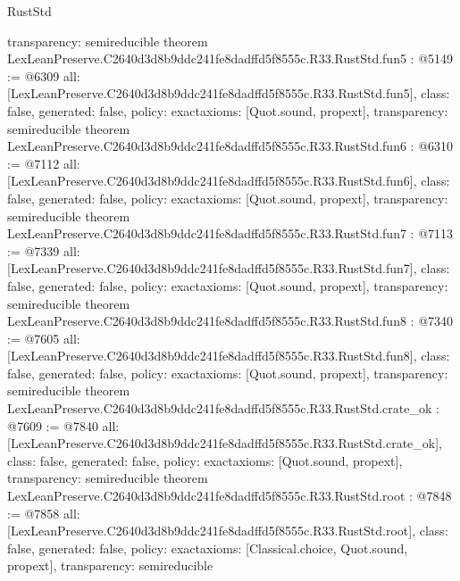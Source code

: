 \begin{lexlean}{RustStd}
\begin{coremodule}
{  transparency: semireducible
}
theorem LexLeanPreserve.C2640d3d8b9ddc241fe8dadffd5f8555c.R33.RustStd.fun5 : @5149 := @6309 {
  all: [LexLeanPreserve.C2640d3d8b9ddc241fe8dadffd5f8555c.R33.RustStd.fun5],
  class: false,
  generated: false,
  policy: exact{axioms: [Quot.sound, propext]},
  transparency: semireducible
}
theorem LexLeanPreserve.C2640d3d8b9ddc241fe8dadffd5f8555c.R33.RustStd.fun6 : @6310 := @7112 {
  all: [LexLeanPreserve.C2640d3d8b9ddc241fe8dadffd5f8555c.R33.RustStd.fun6],
  class: false,
  generated: false,
  policy: exact{axioms: [Quot.sound, propext]},
  transparency: semireducible
}
theorem LexLeanPreserve.C2640d3d8b9ddc241fe8dadffd5f8555c.R33.RustStd.fun7 : @7113 := @7339 {
  all: [LexLeanPreserve.C2640d3d8b9ddc241fe8dadffd5f8555c.R33.RustStd.fun7],
  class: false,
  generated: false,
  policy: exact{axioms: [Quot.sound, propext]},
  transparency: semireducible
}
theorem LexLeanPreserve.C2640d3d8b9ddc241fe8dadffd5f8555c.R33.RustStd.fun8 : @7340 := @7605 {
  all: [LexLeanPreserve.C2640d3d8b9ddc241fe8dadffd5f8555c.R33.RustStd.fun8],
  class: false,
  generated: false,
  policy: exact{axioms: [Quot.sound, propext]},
  transparency: semireducible
}
theorem LexLeanPreserve.C2640d3d8b9ddc241fe8dadffd5f8555c.R33.RustStd.crate_ok : @7609 := @7840 {
  all: [LexLeanPreserve.C2640d3d8b9ddc241fe8dadffd5f8555c.R33.RustStd.crate_ok],
  class: false,
  generated: false,
  policy: exact{axioms: [Quot.sound, propext]},
  transparency: semireducible
}
theorem LexLeanPreserve.C2640d3d8b9ddc241fe8dadffd5f8555c.R33.RustStd.root : @7848 := @7858 {
  all: [LexLeanPreserve.C2640d3d8b9ddc241fe8dadffd5f8555c.R33.RustStd.root],
  class: false,
  generated: false,
  policy: exact{axioms: [Classical.choice, Quot.sound, propext]},
  transparency: semireducible
}


\end{coremodule}
\end{lexlean}
